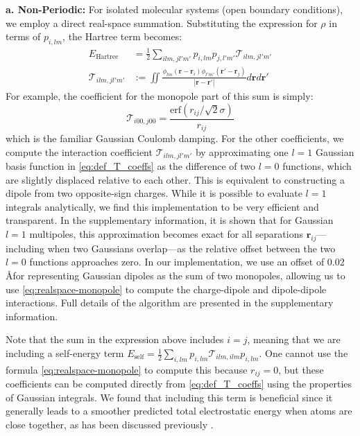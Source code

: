 \documentclass[aps,%
superscriptaddress,
 amsmath,amssymb,
floatfix,
twocolumn
]{revtex4-2}
\begin{document}
\textbf{a. Non-Periodic:}
For isolated molecular systems (open boundary conditions), we employ a direct real-space summation. Substituting the expression for $\rho$ in terms of $p_{i,lm}$, the Hartree term becomes:
\begin{align}
    E_\text{Hartree} &= \frac{1}{2}\sum_{ilm,jl'm'} p_{i,lm}p_{j,l'm'} \mathcal{T}_{ilm,jl'm'} \label{eq:def_E_Hartree} \\
    \mathcal{T}_{ilm,jl'm'} &:=\iint \frac{\phi_{lm}(\mathbf{r}-\mathbf{r}_i)\phi_{l'm'}(\mathbf{r}'-\mathbf{r}_j)}{|\mathbf{r}-\mathbf{r}'|} d\mathbf{r} d\mathbf{r}'
    \label{eq:def_T_coeffs}
\end{align}
For example, the coefficient for the monopole part of this sum is simply:
\begin{equation}
\mathcal{T}_{i00,j00} = \frac{\text{erf}(r_{ij}/\sqrt{2}\sigma)}{r_{ij}}
\label{eq:realspace-monopole}
\end{equation}
which is the familiar Gaussian Coulomb damping. For the other coefficients, we compute the interaction coefficient $\mathcal{T}_{ilm,jl'm'}$ by approximating one $l=1$ Gaussian basis function in \eqref{eq:def_T_coeffs} as the difference of two $l=0$ functions, which are slightly displaced relative to each other. This is equivalent to constructing a dipole from two opposite-sign charges. While it is possible to evaluate $l=1$ integrals analytically, we find this implementation to be very efficient and transparent. In the supplementary information, it is shown that for Gaussian $l=1$ multipoles, this approximation becomes exact for all separations $\mathbf{r}_{ij}$---including when two Gaussians overlap---as the relative offset between the two $l=0$ functions approaches zero. In our implementation, we use an offset of 0.02 \AA \space for representing Gaussian dipoles as the sum of two monopoles, allowing us to use \eqref{eq:realspace-monopole} to compute the charge-dipole and dipole-dipole interactions. Full details of the algorithm are presented in the supplementary information.


Note that the sum in the expression above includes $i=j$, meaning that we are including a self-energy term $E_{\text{self}} = \frac{1}{2} \sum_{i,lm} p_{i,lm} \mathcal{T}_{ilm,ilm} p_{i,lm}$. One cannot use the formula \eqref{eq:realspace-monopole} to compute this because $r_{ij}=0$, but these coefficients can be computed directly from \eqref{eq:def_T_coeffs} using the properties of Gaussian integrals. We found that including this term is beneficial since it generally leads to a smoother predicted total electrostatic energy when atoms are close together, as has been discussed previously \cite{eMLP}.
\end{document}
